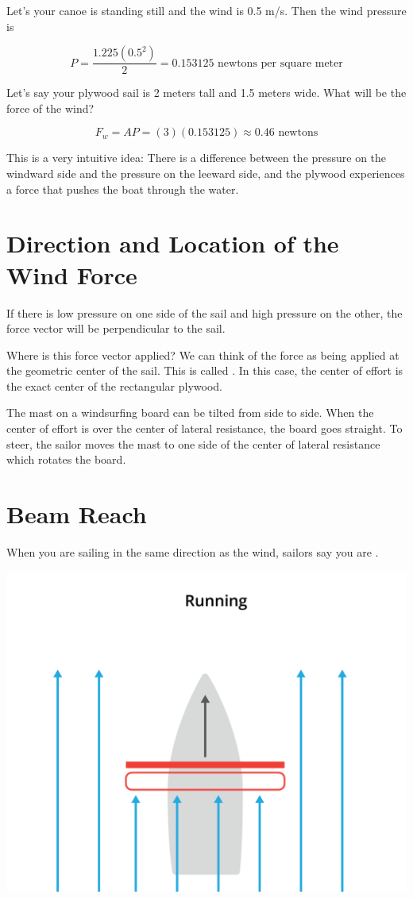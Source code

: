 Let's your canoe is standing still and the wind is 0.5 m/s.  Then the wind pressure is

$$P =  \frac{1.225 (0.5^2)}{2} =  0.153125 \text{ newtons per square meter}$$

Let's say your plywood sail is 2 meters tall and 1.5 meters wide.  What will be the force of the wind?

$$F_w  = A P = (3)(0.153125) \approx 0.46 \text{ newtons}$$

This is a very intuitive idea:  There is a difference between the pressure on the windward side and the pressure on the leeward side,  and the plywood experiences a force that pushes
the boat through the water.



\section{Direction and Location of the Wind Force}

If there is low pressure on one side of the sail and high pressure on the other,  the force vector will be perpendicular to the sail. 
 
Where is this force vector applied?  We can think of the force as being applied at the geometric center of the sail.  This is called .   In this case,  the center of effort is the exact center of the rectangular plywood.

The mast on a windsurfing board can be tilted from side to side.  When the center of effort is over the center of lateral resistance,  the board goes straight.
To steer,   the sailor moves the mast to one side of the center of lateral resistance which rotates the board.

\section{Beam Reach}

When you are sailing in the same direction as the wind,  sailors say you are .   

\includegraphics[width=.75\textwidth]{running.png}


